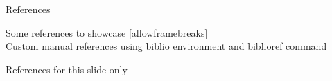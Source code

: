 \documentclass[10pt]{beamer} %
\begin{document}
\begin{frame}{References}

  Some references to showcase [allowframebreaks] \cite{knuth92,ConcreteMath,Simpson,Er01,greenwade93}\\
 
  
  Custom manual references using biblio environment and biblioref command 

  \begin{biblio}{References for this slide only}
  \end{biblio}

\end{frame}
\end{document}
